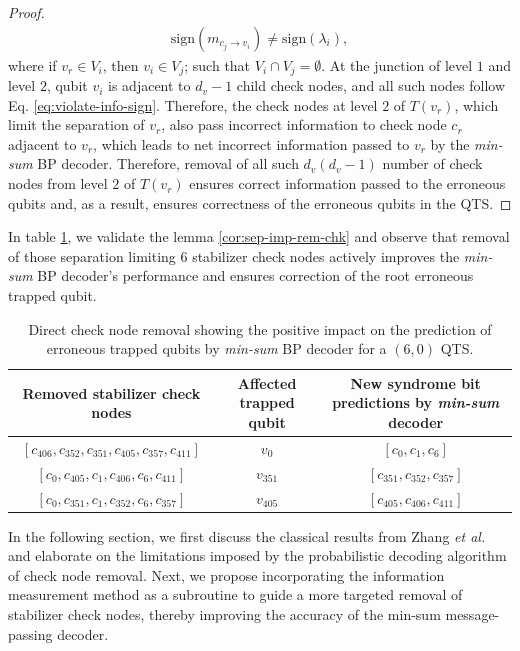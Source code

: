 \documentclass[%
 reprint,
 amsmath,amssymb,
 aps,
pra,
showkeys,
]{revtex4-2}
\begin{document}
\begin{proof}
    \begin{align}
        \mathrm{sign}(m_{c_j \rightarrow v_i}) \neq \mathrm{sign}(\lambda_i),
        \label{eq:violate-info-sign}
    \end{align}
    where if $v_r \in V_i$, then $v_i \in V_j$; such that $V_i \cap V_j = \emptyset$.
    At the junction of level $1$ and level $2$, qubit $v_i$ is adjacent to $d_v - 1$ child check nodes, and all such nodes follow Eq. \eqref{eq:violate-info-sign}.
    Therefore, the check nodes at level $2$ of $T(v_r)$, which limit the separation of $v_r$, also pass incorrect information to check node $c_r$ adjacent to $v_r$, which leads to net incorrect information passed to $v_r$ by the \textit{min-sum} BP decoder.
    Therefore, removal of all such $d_v(d_v - 1)$ number of check nodes from level $2$ of $T(v_r)$ ensures correct information passed to the erroneous qubits and, as a result, ensures correctness of the erroneous qubits in the QTS.
\end{proof}
In table \ref{table:qts-882}, we validate the lemma \ref{cor:sep-imp-rem-chk} and observe that removal of those separation limiting $6$ stabilizer check nodes actively improves the \textit{min-sum} BP decoder's performance and ensures correction of the root erroneous trapped qubit.
\begin{table}[!ht]
    \centering
    {
    \renewcommand{\arraystretch}{1.75}
    \setlength{\tabcolsep}{3pt}
    \begin{tabular}{|c|c|c|}
        \hline
        \parbox[c]{4.3cm}{\centering Removed stabilizer check nodes} & \parbox[c]{1.35cm}{\centering Affected trapped qubit} & \parbox[c]{2.15cm}{\centering New syndrome bit predictions by \textit{min-sum} decoder}\\
        \hline
        \parbox[c]{4.3cm}{\raggedright $[c_{406},c_{352},c_{351},c_{405},c_{357},c_{411}]$} & \parbox[c]{1.35cm}{\centering $v_0$} & \parbox[c]{2.15cm}{\centering $[c_0, c_1, c_6]$}\\
        \hline
        \parbox[c]{4.3cm}{\raggedright $[c_{0},c_{405},c_{1},c_{406},c_{6},c_{411}]$} & \parbox[c]{1.35cm}{\centering $v_{351}$} & \parbox[c]{2.15cm}{\centering $[c_{351},c_{352},c_{357}]$}\\
        \hline
        \parbox[c]{4.3cm}{\raggedright $[c_{0},c_{351},c_{1},c_{352},c_{6},c_{357}]$} & \parbox[c]{1.35cm}{\centering $v_{405}$} & \parbox[c]{2.15cm}{\centering $[c_{405},c_{406},c_{411}]$}\\
        \hline
    \end{tabular}
    }
    \caption{Direct check node removal showing the positive impact on the prediction of erroneous trapped qubits by \textit{min-sum} BP decoder for a $(6,0)$ QTS.}
    \label{table:qts-882}
\end{table}
In the following section, we first discuss the classical results from Zhang \emph{et al.} and elaborate on the limitations imposed by the probabilistic decoding algorithm of check node removal.
Next, we propose incorporating the information measurement method \cite{xu2018iterative} as a subroutine to guide a more targeted removal of stabilizer check nodes, thereby improving the accuracy of the min-sum message-passing decoder.
\end{document}
